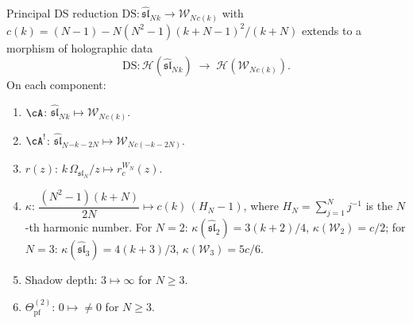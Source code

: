 \begin{construction}
\label{constr:ds-reduction-holographic}
Principal DS reduction
$\mathrm{DS}\colon\widehat{\mathfrak{sl}}_N{}_k
\to\mathcal W_N{}_{c(k)}$
with $c(k) = (N-1) - N(N^2-1)(k+N-1)^2/(k+N)$ extends to a morphism
of holographic data
\[
\mathrm{DS}\colon
\mathcal H(\widehat{\mathfrak{sl}}_N{}_k)
\;\longrightarrow\;
\mathcal H(\mathcal W_N{}_{c(k)}).
\]
On each component:
\begin{enumerate}[label=\textup{(\roman*)}]
\item $\cA$: $\widehat{\mathfrak{sl}}_N{}_k \mapsto
 \mathcal W_N{}_{c(k)}$.
\item $\cA^!$: $\widehat{\mathfrak{sl}}_N{}_{-k-2N} \mapsto
 \mathcal W_N{}_{c(-k-2N)}$.
\item $r(z)$: $k\,\Omega_{\mathfrak{sl}_N}/z \mapsto
 r_c^{W_N}(z)$.
\item $\kappa$:
 $\dfrac{(N^2-1)(k+N)}{2N} \mapsto c(k)\,(H_N - 1)$,
 where $H_N = \sum_{j=1}^N j^{-1}$ is the $N$-th harmonic number.
 For $N=2$: $\kappa(\widehat{\mathfrak{sl}}_2) = 3(k+2)/4$,
 $\kappa(\mathcal W_2) = c/2$; for $N=3$:
 $\kappa(\widehat{\mathfrak{sl}}_3) = 4(k+3)/3$,
 $\kappa(\mathcal W_3) = 5c/6$.
\item Shadow depth: $3 \mapsto \infty$ for $N \geq 3$.
\item $\Theta^{(2)}_{\mathrm{pf}}$: $0 \mapsto \neq 0$
 for $N \geq 3$.
\end{enumerate}
\end{construction}

